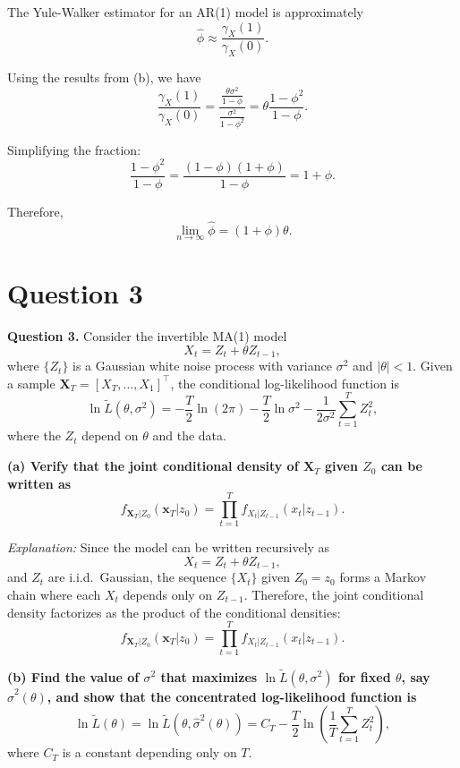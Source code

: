 \documentclass{article}
\begin{document}
\medskip

The Yule-Walker estimator for an AR(1) model is approximately
\[
\hat{\phi} \approx \frac{\gamma_X(1)}{\gamma_X(0)}.
\]

Using the results from (b), we have
\[
\frac{\gamma_X(1)}{\gamma_X(0)} = \frac{\frac{\theta \sigma^2}{1 - \phi}}{\frac{\sigma^2}{1 - \phi^2}} = \theta \frac{1 - \phi^2}{1 - \phi}.
\]

Simplifying the fraction:
\[
\frac{1 - \phi^2}{1 - \phi} = \frac{(1 - \phi)(1 + \phi)}{1 - \phi} = 1 + \phi.
\]

Therefore,
\[
\boxed{
\lim_{n \to \infty} \hat{\phi} = (1 + \phi) \theta.
}
\]
\section{Question 3}
\textbf{Question 3.} Consider the invertible MA(1) model
\[
X_t = Z_t + \theta Z_{t-1},
\]
where \(\{Z_t\}\) is a Gaussian white noise process with variance \(\sigma^2\) and \(|\theta| < 1\). Given a sample \(\mathbf{X}_T = [X_T, \ldots, X_1]^\top\), the conditional log-likelihood function is
\[
\ln \tilde{L}(\theta, \sigma^2) = -\frac{T}{2} \ln(2\pi) - \frac{T}{2} \ln \sigma^2 - \frac{1}{2\sigma^2} \sum_{t=1}^T Z_t^2,
\]
where the \(Z_t\) depend on \(\theta\) and the data.

\bigskip

\textbf{(a) Verify that the joint conditional density of \(\mathbf{X}_T\) given \(Z_0\) can be written as}
\[
f_{\mathbf{X}_T | Z_0}(\mathbf{x}_T | z_0) = \prod_{t=1}^T f_{X_t | Z_{t-1}}(x_t | z_{t-1}).
\]

\medskip

\textit{Explanation:} Since the model can be written recursively as
\[
X_t = Z_t + \theta Z_{t-1},
\]
and \(Z_t\) are i.i.d.\ Gaussian, the sequence \(\{X_t\}\) given \(Z_0 = z_0\) forms a Markov chain where each \(X_t\) depends only on \(Z_{t-1}\). Therefore, the joint conditional density factorizes as the product of the conditional densities:
\[
f_{\mathbf{X}_T | Z_0}(\mathbf{x}_T | z_0) = \prod_{t=1}^T f_{X_t | Z_{t-1}}(x_t | z_{t-1}).
\]

\bigskip

\textbf{(b) Find the value of \(\sigma^2\) that maximizes \(\ln \tilde{L}(\theta, \sigma^2)\) for fixed \(\theta\), say \(\hat{\sigma}^2(\theta)\), and show that the concentrated log-likelihood function is}
\[
\ln \tilde{L}(\theta) = \ln \tilde{L}(\theta, \hat{\sigma}^2(\theta)) = C_T - \frac{T}{2} \ln \left( \frac{1}{T} \sum_{t=1}^T Z_t^2 \right),
\]
where \(C_T\) is a constant depending only on \(T\).
\end{document}
